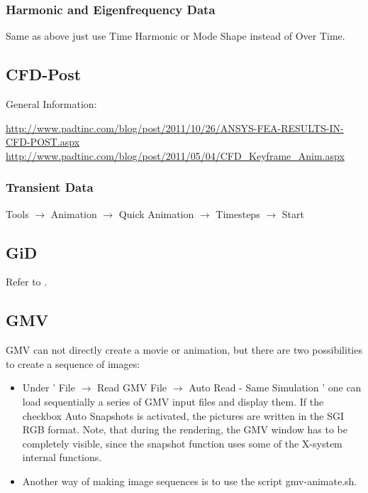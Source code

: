 \subsubsection{Harmonic and Eigenfrequency Data}

Same as above just use Time Harmonic or Mode Shape instead of Over Time.

\subsection{CFD-Post}

General Information:

\url{http://www.padtinc.com/blog/post/2011/10/26/ANSYS-FEA-RESULTS-IN-CFD-POST.aspx}
\url{http://www.padtinc.com/blog/post/2011/05/04/CFD_Keyframe_Anim.aspx}

\subsubsection{Transient Data}

Tools  $\rightarrow$  Animation  $\rightarrow$ Quick  Animation  $\rightarrow$
Timesteps $\rightarrow$ Start

\subsection{GiD}
Refer   to   \cite{Simkovics2010}.

\subsection{GMV}

GMV  can  not  directly  create  a  movie or  animation,  but  there  are  two
possibilities to create a sequence of images:

\begin{itemize}
    \item Under '  File $\rightarrow$ Read GMV File $\rightarrow$  Auto Read -
      Same Simulation ' one can load  sequentially a series of GMV input files
      and  display them.  If the  checkbox  Auto Snapshots  is activated,  the
      pictures  are written  in  the SGI  RGB format.  Note,  that during  the
      rendering,  the GMV  window  has  to be  completely  visible, since  the
      snapshot function uses some of the X-system internal functions.

    \item  Another  way  of  making  image sequences  is  to  use  the  script
      gmv-animate.sh.
\end{itemize}

